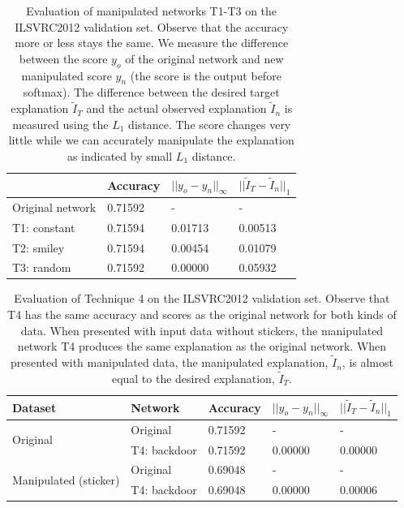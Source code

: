 \documentclass{article}
\begin{document}
\begin{table}[htb]
\begin{center}
\begin{tabular}{@{}llll@{}}
\toprule
                 & Accuracy & $||y_o-y_n||_\infty$ & $||\tilde{I}_T-\tilde{I}_n||_1$ \\ \midrule
Original network & 0.71592                    & -                           & -                            \\
T1: constant     & 0.71594                    & 0.01713                     & 0.00513                      \\
T2: smiley       & 0.71594                    & 0.00454                     & 0.01079                      \\
T3: random       & 0.71592                    & 0.00000                     & 0.05932                             \\ \bottomrule
\end{tabular}
\end{center}
\vskip 0.02in
\caption{Evaluation of manipulated networks T1-T3 on the ILSVRC2012 validation set. Observe that the accuracy more or less stays the same. We measure the difference between the score $y_o$ of the original network and new manipulated score $y_n$ (the score is the output before softmax). The difference between the desired target explanation $\tilde{I}_T$ and the actual observed explanation $\tilde{I}_n$ is measured using the $L_1$ distance. The score changes very little while we can  accurately manipulate the explanation as indicated by small $L_1$ distance. }\label{t_res1}
\end{table}

\begin{table}[htb]
\begin{center}
\begin{tabular}{@{}lllll@{}}
\toprule
Dataset                       & Network         & Accuracy     & $||y_o-y_n||_\infty$ & $||\tilde{I}_T-\tilde{I}_n||_1$ \\ \midrule
\multirow{2}{*}{Original}   & Original & 0.71592 & -               & -                 \\
                              & T4: backdoor       & 0.71592 & 0.00000         & 0.00000           \\ \midrule
\multirow{2}{*}{Manipulated (sticker)} & Original & 0.69048 & -               & -                 \\
                              & T4: backdoor       & 0.69048 & 0.00000         & 0.00006          \\ \bottomrule 
\end{tabular}
\end{center}
\vskip 0.02in
\caption{Evaluation of Technique 4 on the ILSVRC2012 validation set. Observe that T4 has the same accuracy and scores as the original network for both kinds of data. When presented with input data without stickers, the manipulated network T4 produces the same explanation as the original network. When presented with manipulated data, the manipulated explanation, $\tilde{I}_n$, is almost equal to the desired explanation, $\tilde{I}_T$.}\label{t_res2}
\end{table}
\end{document}
